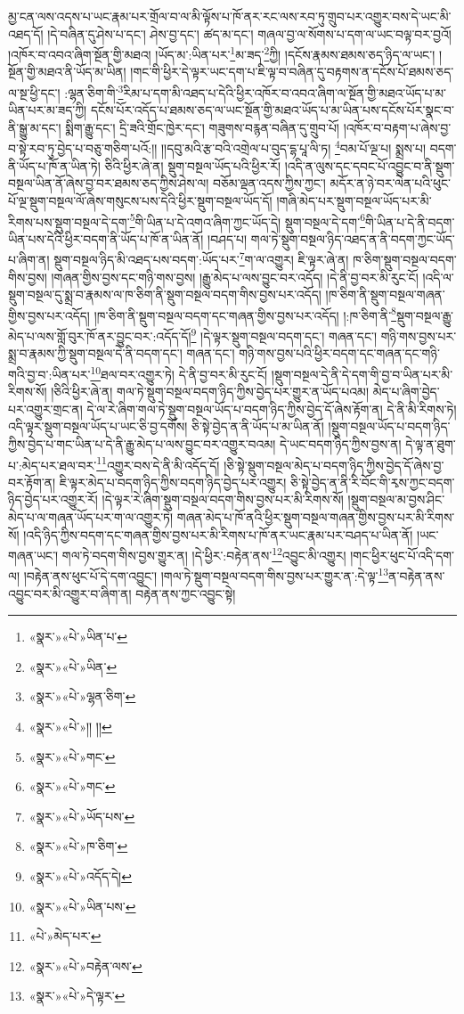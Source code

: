 མྱ་ངན་ལས་འདས་པ་ཡང་རྣམ་པར་གྲོལ་བ་ལ་མི་ལྟོས་པ་ཁོ་ནར་རང་ལས་རབ་ཏུ་གྲུབ་པར་འགྱུར་བས་དེ་ཡང་མི་འཐད་དོ། །དེ་བཞིན་དུ་ཤེས་པ་དང་། ཤེས་བྱ་དང་། ཚད་མ་དང་། གཞལ་བྱ་ལ་སོགས་པ་དག་ལ་ཡང་བལྟ་བར་བྱའོ། །འཁོར་བ་འབའ་ཞིག་སྔོན་གྱི་མཐའ། །ཡོད་མ་:ཡིན་པར་\footnote{«སྣར་»«པེ་»ཡིན་པ་}མ་ཟད་\footnote{«སྣར་»«པེ་»ཡིན་}ཀྱི། །དངོས་རྣམས་ཐམས་ཅད་ཉིད་ལ་ཡང་། །སྔོན་གྱི་མཐའ་ནི་ཡོད་མ་ཡིན། །གང་གི་ཕྱིར་དེ་ལྟར་ཡང་དག་པ་ཇི་ལྟ་བ་བཞིན་དུ་བརྟགས་ན་དངོས་པོ་ཐམས་ཅད་ལ་སྔ་ཕྱི་དང་། :ལྷན་ཅིག་གི་\footnote{«སྣར་»«པེ་»ལྷན་ཅིག་}རིམ་པ་དག་མི་འཐད་པ་དེའི་ཕྱིར་འཁོར་བ་འབའ་ཞིག་ལ་སྔོན་གྱི་མཐའ་ཡོད་པ་མ་ཡིན་པར་མ་ཟད་ཀྱི། དངོས་པོར་འདོད་པ་ཐམས་ཅད་ལ་ཡང་སྔོན་གྱི་མཐའ་ཡོད་པ་མ་ཡིན་པས་དངོས་པོར་སྣང་བ་ནི་སྒྱུ་མ་དང་། སྨིག་རྒྱུ་དང་། དྲི་ཟའི་གྲོང་ཁྱེར་དང་། གཟུགས་བརྙན་བཞིན་དུ་གྲུབ་པོ། །འཁོར་བ་བརྟག་པ་ཞེས་བྱ་བ་སྟེ་རབ་ཏུ་བྱེད་པ་བཅུ་གཅིག་པའོ:།། །།དབུ་མའི་རྩ་བའི་འགྲེལ་པ་བུད་དྷ་པཱ་ལི་ཏ། \footnote{«སྣར་»«པེ་»།། །། }བམ་པོ་ལྔ་པ། སྨྲས་པ། བདག་ནི་ཡོད་པ་ཁོ་ན་ཡིན་ཏེ། ཅིའི་ཕྱིར་ཞེ་ན། སྡུག་བསྔལ་ཡོད་པའི་ཕྱིར་རོ། །འདི་ན་ལུས་དང་དབང་པོ་འབྱུང་བ་ནི་སྡུག་བསྔལ་ཡིན་ནོ་ཞེས་བྱ་བར་ཐམས་ཅད་ཀྱིས་ཤེས་ལ། བཅོམ་ལྡན་འདས་ཀྱིས་ཀྱང་། མདོར་ན་ཉེ་བར་ལེན་པའི་ཕུང་པོ་ལྔ་སྡུག་བསྔལ་ལོ་ཞེས་གསུངས་པས་དེའི་ཕྱིར་སྡུག་བསྔལ་ཡོད་དོ། །གཞི་མེད་པར་སྡུག་བསྔལ་ཡོད་པར་མི་རིགས་པས་སྡུག་བསྔལ་དེ་དག་\footnote{«སྣར་»«པེ་»གང་}གི་ཡིན་པ་དེ་འགའ་ཞིག་ཀྱང་ཡོད་དེ། སྡུག་བསྔལ་དེ་དག་\footnote{«སྣར་»«པེ་»གང་}གི་ཡིན་པ་དེ་ནི་བདག་ཡིན་པས་དེའི་ཕྱིར་བདག་ནི་ཡོད་པ་ཁོ་ན་ཡིན་ནོ། །བཤད་པ། གལ་ཏེ་སྡུག་བསྔལ་ཉིད་འཐད་ན་ནི་བདག་ཀྱང་ཡོད་པ་ཞིག་ན། སྡུག་བསྔལ་ཉིད་མི་འཐད་པས་བདག་:ཡོད་པར་\footnote{«སྣར་»«པེ་»ཡོད་པས་}ག་ལ་འགྱུར། ཇི་ལྟར་ཞེ་ན། ཁ་ཅིག་སྡུག་བསྔལ་བདག་གིས་བྱས། །གཞན་གྱིས་བྱས་དང་གཉི་གས་བྱས། །རྒྱུ་མེད་པ་ལས་བྱུང་བར་འདོད། །དེ་ནི་བྱ་བར་མི་རུང་ངོ། །འདི་ལ་སྡུག་བསྔལ་དུ་སྨྲ་བ་རྣམས་ལ་ཁ་ཅིག་ནི་སྡུག་བསྔལ་བདག་གིས་བྱས་པར་འདོད། །ཁ་ཅིག་ནི་སྡུག་བསྔལ་གཞན་གྱིས་བྱས་པར་འདོད། །ཁ་ཅིག་ནི་སྡུག་བསྔལ་བདག་དང་གཞན་གྱིས་བྱས་པར་འདོད། །:ཁ་ཅིག་ནི་\footnote{«སྣར་»«པེ་»ཁ་ཅིག་}སྡུག་བསྔལ་རྒྱུ་མེད་པ་ལས་གློ་བུར་ཁོ་ནར་བྱུང་བར་:འདོད་དོ།\footnote{«སྣར་»«པེ་»འདོད་དེ།} །དེ་ལྟར་སྡུག་བསྔལ་བདག་དང་། གཞན་དང་། གཉི་གས་བྱས་པར་སྨྲ་བ་རྣམས་ཀྱི་སྡུག་བསྔལ་དེ་ནི་བདག་དང་། གཞན་དང་། གཉི་གས་བྱས་པའི་ཕྱིར་བདག་དང་གཞན་དང་གཉི་གའི་བྱ་བ་:ཡིན་པར་\footnote{«སྣར་»«པེ་»ཡིན་པས་}ཐལ་བར་འགྱུར་ཏེ། དེ་ནི་བྱ་བར་མི་རུང་ངོ། །སྡུག་བསྔལ་དེ་ནི་དེ་དག་གི་བྱ་བ་ཡིན་པར་མི་རིགས་སོ། །ཅིའི་ཕྱིར་ཞེ་ན། གལ་ཏེ་སྡུག་བསྔལ་བདག་ཉིད་ཀྱིས་བྱེད་པར་གྱུར་ན་ཡོད་པའམ། མེད་པ་ཞིག་བྱེད་པར་འགྱུར་གྲང་ན། དེ་ལ་རེ་ཞིག་གལ་ཏེ་སྡུག་བསྔལ་ཡོད་པ་བདག་ཉིད་ཀྱིས་བྱེད་དོ་ཞེས་རྟོག་ན། དེ་ནི་མི་རིགས་ཏེ། འདི་ལྟར་སྡུག་བསྔལ་ཡོད་པ་ཡང་ཅི་བྱ་དགོས། ཅི་སྟེ་བྱེད་ན་ནི་ཡོད་པ་མ་ཡིན་ནོ། །སྡུག་བསྔལ་ཡོད་པ་བདག་ཉིད་ཀྱིས་བྱེད་པ་གང་ཡིན་པ་དེ་ནི་རྒྱུ་མེད་པ་ལས་བྱུང་བར་འགྱུར་བའམ། དེ་ཡང་བདག་ཉིད་ཀྱིས་བྱས་ན། དེ་ལྟ་ན་ཐུག་པ་:མེད་པར་ཐལ་བར་\footnote{«པེ་»མེད་པར་}འགྱུར་བས་དེ་ནི་མི་འདོད་དོ། །ཅི་སྟེ་སྡུག་བསྔལ་མེད་པ་བདག་ཉིད་ཀྱིས་བྱེད་དོ་ཞེས་བྱ་བར་རྟོག་ན། ཇི་ལྟར་མེད་པ་བདག་ཉིད་ཀྱིས་བདག་ཉིད་བྱེད་པར་འགྱུར། ཅི་སྟེ་བྱེད་ན་ནི་རི་བོང་གི་རྭས་ཀྱང་བདག་ཉིད་བྱེད་པར་འགྱུར་རོ། །དེ་ལྟར་རེ་ཞིག་སྡུག་བསྔལ་བདག་གིས་བྱས་པར་མི་རིགས་སོ། །སྡུག་བསྔལ་མ་བྱས་ཤིང་མེད་པ་ལ་གཞན་ཡོད་པར་ག་ལ་འགྱུར་ཏེ། གཞན་མེད་པ་ཁོ་ནའི་ཕྱིར་སྡུག་བསྔལ་གཞན་གྱིས་བྱས་པར་མི་རིགས་སོ། །འདི་ཉིད་ཀྱིས་བདག་དང་གཞན་གྱིས་བྱས་པར་མི་རིགས་པ་ཁོ་ནར་ཡང་རྣམ་པར་བཤད་པ་ཡིན་ནོ། །ཡང་གཞན་ཡང་། གལ་ཏེ་བདག་གིས་བྱས་གྱུར་ན། །དེ་ཕྱིར་:བརྟེན་ནས་\footnote{«སྣར་»«པེ་»བརྟེན་ལས་}འབྱུང་མི་འགྱུར། །གང་ཕྱིར་ཕུང་པོ་འདི་དག་ལ། །བརྟེན་ནས་ཕུང་པོ་དེ་དག་འབྱུང་། །གལ་ཏེ་སྡུག་བསྔལ་བདག་གིས་བྱས་པར་གྱུར་ན་:དེ་ལྟ་\footnote{«སྣར་»«པེ་»དེ་ལྟར་}ན་བརྟེན་ནས་འབྱུང་བར་མི་འགྱུར་བ་ཞིག་ན། བརྟེན་ནས་ཀྱང་འབྱུང་སྟེ། 